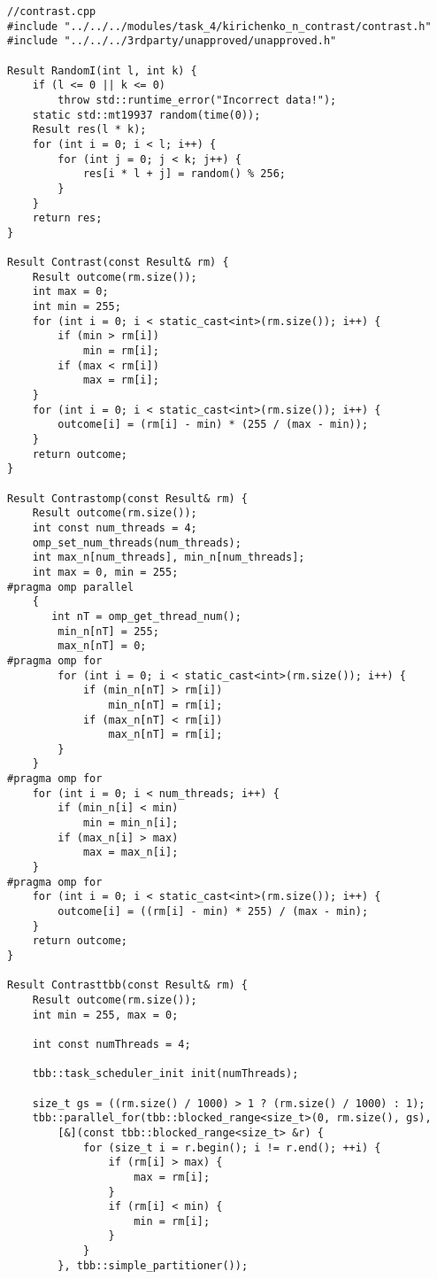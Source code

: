 \documentclass{report}
\begin{document}
\begin{lstlisting}
//contrast.cpp
#include "../../../modules/task_4/kirichenko_n_contrast/contrast.h"
#include "../../../3rdparty/unapproved/unapproved.h"

Result RandomI(int l, int k) {
    if (l <= 0 || k <= 0)
        throw std::runtime_error("Incorrect data!");
    static std::mt19937 random(time(0));
    Result res(l * k);
    for (int i = 0; i < l; i++) {
        for (int j = 0; j < k; j++) {
            res[i * l + j] = random() % 256;
        }
    }
    return res;
}

Result Contrast(const Result& rm) {
    Result outcome(rm.size());
    int max = 0;
    int min = 255;
    for (int i = 0; i < static_cast<int>(rm.size()); i++) {
        if (min > rm[i])
            min = rm[i];
        if (max < rm[i])
            max = rm[i];
    }
    for (int i = 0; i < static_cast<int>(rm.size()); i++) {
        outcome[i] = (rm[i] - min) * (255 / (max - min));
    }
    return outcome;
}

Result Contrastomp(const Result& rm) {
    Result outcome(rm.size());
    int const num_threads = 4;
    omp_set_num_threads(num_threads);
    int max_n[num_threads], min_n[num_threads];
    int max = 0, min = 255;
#pragma omp parallel
    {
       int nT = omp_get_thread_num();
        min_n[nT] = 255;
        max_n[nT] = 0;
#pragma omp for
        for (int i = 0; i < static_cast<int>(rm.size()); i++) {
            if (min_n[nT] > rm[i])
                min_n[nT] = rm[i];
            if (max_n[nT] < rm[i])
                max_n[nT] = rm[i];
        }
    }
#pragma omp for
    for (int i = 0; i < num_threads; i++) {
        if (min_n[i] < min)
            min = min_n[i];
        if (max_n[i] > max)
            max = max_n[i];
    }
#pragma omp for
    for (int i = 0; i < static_cast<int>(rm.size()); i++) {
        outcome[i] = ((rm[i] - min) * 255) / (max - min);
    }
    return outcome;
}

Result Contrasttbb(const Result& rm) {
    Result outcome(rm.size());
    int min = 255, max = 0;

    int const numThreads = 4;

    tbb::task_scheduler_init init(numThreads);

    size_t gs = ((rm.size() / 1000) > 1 ? (rm.size() / 1000) : 1);
    tbb::parallel_for(tbb::blocked_range<size_t>(0, rm.size(), gs),
        [&](const tbb::blocked_range<size_t> &r) {
            for (size_t i = r.begin(); i != r.end(); ++i) {
                if (rm[i] > max) {
                    max = rm[i];
                }
                if (rm[i] < min) {
                    min = rm[i];
                }
            }
        }, tbb::simple_partitioner());


\end{lstlisting}
\end{document}
